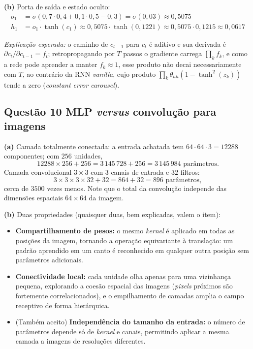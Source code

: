 \documentclass[11pt,a4paper]{article}
\begin{document}
\textbf{(b)} Porta de saída e estado oculto:
\begin{align*}
    o_1 &= \sigma(0{,}7 \cdot 0{,}4 + 0{,}1 \cdot 0{,}5 - 0{,}3) = \sigma(0{,}03) \approx 0{,}5075 \\
    h_1 &= o_1 \cdot \tanh(c_1) \approx 0{,}5075 \cdot \tanh(0{,}1221) \approx 0{,}5075 \cdot 0{,}1215 \approx 0{,}0617
\end{align*}

\textit{Explicação esperada:} o caminho de $c_{t-1}$ para $c_t$ é aditivo e sua derivada é $\partial c_t / \partial c_{t-1} = f_t$; retropropagando por $T$ passos o gradiente carrega $\prod_k f_k$, e como a rede pode aprender a manter $f_k \approx 1$, esse produto não decai necessariamente com $T$, ao contrário da RNN \textit{vanilla}, cujo produto $\prod_k \theta_{hh}(1-\tanh^2(z_k))$ tende a zero (\textit{constant error carousel}).

\subsection*{Questão 10 \textemdash{} MLP \textit{versus} convolução para imagens}

\textbf{(a)} Camada totalmente conectada: a entrada achatada tem $64 \cdot 64 \cdot 3 = 12288$ componentes; com $256$ unidades,
\[
12288 \times 256 + 256 = 3\,145\,728 + 256 = 3\,145\,984 \text{ parâmetros}.
\]
Camada convolucional $3 \times 3$ com $3$ canais de entrada e $32$ filtros:
\[
3 \times 3 \times 3 \times 32 + 32 = 864 + 32 = 896 \text{ parâmetros},
\]
cerca de $3500$ vezes menos. Note que o total da convolução independe das dimensões espaciais $64 \times 64$ da imagem.

\textbf{(b)} Duas propriedades (quaisquer duas, bem explicadas, valem o item):
\begin{itemize}
    \item \textbf{Compartilhamento de pesos:} o mesmo \textit{kernel} é aplicado em todas as posições da imagem, tornando a operação equivariante à translação: um padrão aprendido em um canto é reconhecido em qualquer outra posição sem parâmetros adicionais.
    \item \textbf{Conectividade local:} cada unidade olha apenas para uma vizinhança pequena, explorando a coesão espacial das imagens (\textit{pixels} próximos são fortemente correlacionados), e o empilhamento de camadas amplia o campo receptivo de forma hierárquica.
    \item (Também aceito) \textbf{Independência do tamanho da entrada:} o número de parâmetros depende só de \textit{kernel} e canais, permitindo aplicar a mesma camada a imagens de resoluções diferentes.
\end{itemize}

\color{black}
\end{document}

